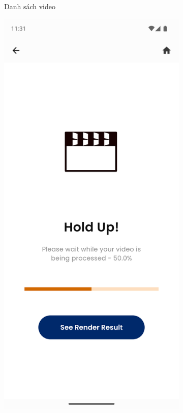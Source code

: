 \begin{figure}[H]
\begin{subfigure}{0.32\textwidth}
        \caption{Danh sách video}
    \end{subfigure}
    \hfill
    \begin{subfigure}{0.32\textwidth}
        \includegraphics[width=1\linewidth]{figures/c4/4-2/video_2.png} 

\end{subfigure}
\end{figure}
